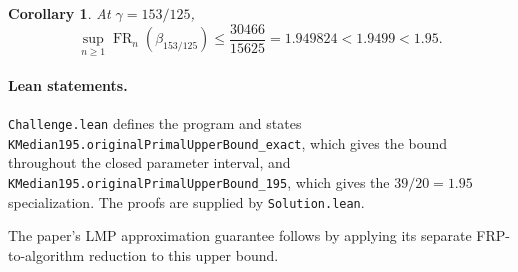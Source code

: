 \documentclass[11pt]{article}
\newtheorem{corollary}[theorem]{Corollary}
\theoremstyle{definition}
\newcommand{\FR}{\operatorname{FR}}
\begin{document}
\begin{corollary}
At $\gamma=153/125$,
\[
  \sup_{n\ge1}\FR_n(\beta_{153/125})
  \le \frac{30466}{15625}=1.949824<1.9499<1.95.
\]
\end{corollary}

\paragraph{Lean statements.}
\texttt{Challenge.lean} defines the program and states
\nolinkurl{KMedian195.originalPrimalUpperBound_exact}, which gives the
bound throughout the closed parameter interval, and
\nolinkurl{KMedian195.originalPrimalUpperBound_195}, which gives the
$39/20=1.95$ specialization. The proofs are supplied by
\texttt{Solution.lean}.

The paper's LMP approximation guarantee follows by applying its separate
FRP-to-algorithm reduction to this upper bound.
\end{document}

